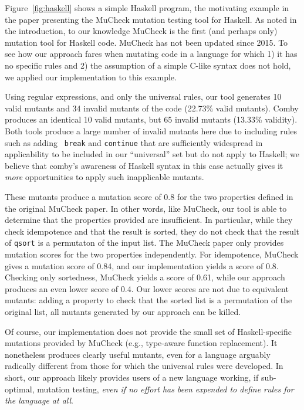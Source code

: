 \documentclass[sigconf,review, anonymous]{acmart}
\begin{document}
{\begin{figure}
\end{figure}

Figure~\ref{fig:haskell} shows a simple Haskell program, the
motivating example in the paper presenting the MuCheck \cite{mucheck}
mutation testing tool for Haskell.  As noted in the introduction, to our
knowledge MuCheck is the first (and perhaps only) mutation tool for
Haskell code.  MuCheck has not been updated since 2015.
To see how our approach fares when mutating code in a language for
which 1) it has no specific rules and 2) the assumption of a simple
C-like syntax does not hold, we applied our implementation to this example.

Using regular expressions, and only the universal rules, our tool
generates 10 valid mutants and 34 invalid mutants of the code (22.73\%
valid mutants).  Comby produces an identical 10 valid mutants, but 65
invalid mutants (13.33\% validity).  Both tools produce a large number
of invalid mutants here due to including rules such as adding {\tt
  break} and {\tt continue} that are sufficiently widespread in
applicability to be included in our ``universal'' set but do not apply
to Haskell; we believe that comby's awareness of Haskell syntax in
this case actually gives it \emph{more} opportunities to apply such
inapplicable mutants.

These mutants produce a mutation
score of 0.8 for the two properties defined in the original MuCheck
paper.  In other words, like MuCheck, our tool is able to
determine that the properties provided are insufficient.  In
particular, while they check idempotence and that the result is
sorted, they do not check that the result of {\tt qsort} is a permutaton of the input
list.  The MuCheck paper only provides mutation scores for the two
properties independently.  For idempotence, MuCheck gives a mutation
score of 0.84, and our implementation yields a score of 0.8.  Checking
only sortedness, MuCheck yields a score of 0.61, while our approach
produces an even lower score of 0.4.  Our lower
scores are not due to equivalent mutants: adding a property to check
that the sorted list is a permutation of the original list, all
mutants generated by our approach can be killed.

Of course, our implementation does not provide the small set of Haskell-specific
mutations provided by MuCheck (e.g., type-aware function replacement).  It nonetheless produces clearly useful
mutants, even for a language arguably radically different from those
for which the universal rules were developed.  In short, our approach
likely provides users of a new language working, if sub-optimal, mutation testing,
\emph{even if no effort has been expended to define rules for the
  language at all}.

}
\end{document}
